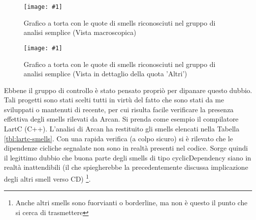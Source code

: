 \documentclass[a4paper,11pt,oneside, table]{article}
\newcommand{\putsubimage}[5] {
  \begin{minipage}{{#4}\linewidth}
    \centering
    \texttt{[image: \#1]}
    \caption{#2}\label{#3}
  \end{minipage}
}
\newcommand{\putimagecouple}[2] {
  \begin{figure}[!htb]
    \centering
    #1
    \hspace{0.5cm}
    #2
  \end{figure}
}
\begin{document}
  \putimagecouple
  {\putsubimage{images/smells-big.png}{Grafico a torta con le quote di smells riconosciuti nel gruppo di analisi semplice (Vista macroscopica)}{png:smells-big}{0.45}{1}}
  {\putsubimage{images/smells-small.png}{Grafico a torta con le quote di smells riconosciuti nel gruppo di analisi semplice (Vista in dettaglio della quota 'Altri')}{png:smells-small}{0.45}{1}}

  Ebbene il gruppo di controllo \`e stato pensato propri\`o per dipanare questo dubbio. Tali progetti sono stati scelti tutti in virt\`u del fatto che sono stati da me sviluppati o mantenuti di recente, per cui risulta facile verificare la presenza effettiva degli smells rilevati da Arcan. Si prenda come esempio il compilatore LartC \cite{lartcRepo} (C++). L'analisi di Arcan ha restituito gli smells elencati nella Tabella \ref{tbl:lartc-smells}. Con una rapida verifica (a colpo sicuro) si \`e rilevato che le dipendenze cicliche segnalate non sono in realt\`a presenti nel codice. Sorge quindi il legittimo dubbio che buona parte degli smells di tipo cyclicDependency siano in realt\`a inattendibili (il che spiegherebbe la precedentemente discussa implicazione degli altri smell verso CD) \footnote{Anche altri smells sono fuorvianti o borderline, ma non \`e questo il punto che si cerca di trasmettere}.

  \begin{table}
    \label{tbl:lartc-smells}
  \end{table}
\end{document}
